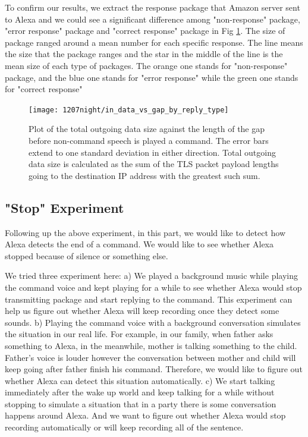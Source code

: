 To confirm our results, we extract the response package that Amazon server sent to Alexa and we could see a significant difference among "non-response" package, "error response" package and "correct response" package in Fig \ref{fig:postfix_variablegap_sizes}. The size of package ranged around a mean number for each specific response. The line means the size that the package ranges and the star in the middle of the line is the mean size of each type of packages. The orange one stands for "non-response" package, and the blue one stands for "error response" while the green one stands for "correct response" 

\begin{figure}[]
    \centering
    \texttt{[image: 1207night/in\_data\_vs\_gap\_by\_reply\_type]}
    \caption{Plot of the total outgoing data size against the length of the gap before non-command speech is played a command. The error bars extend to one standard deviation in either direction. Total outgoing data size is calculated as the sum of the TLS packet payload lengths going to the destination IP address with the greatest such sum.}
    \label{fig:postfix_variablegap_sizes}
\end{figure}








\subsection{"Stop" Experiment}

Following up the above experiment, in this part, we would like to detect how Alexa detects the end of a command. We would like to see whether Alexa stopped because of silence or something else.

We tried three experiment here: a) We played a background music while playing the command voice and kept playing for a while to see whether Alexa would stop transmitting package and start replying to the command. This experiment can help us figure out whether Alexa will keep recording once they detect some sounds. b) Playing the command voice with a background conversation simulates the situation in our real life. For example, in our family, when father asks something to Alexa, in the meanwhile, mother is talking something to the child. Father's voice is louder however the conversation between mother and child will keep going after father finish his command. Therefore, we would like to figure out whether Alexa can detect this situation automatically. c) We start talking immediately after the wake up world and keep talking for a while without stopping to simulate a situation that in a party there is some conversation happens around Alexa. And we want to figure out whether Alexa would stop recording automatically or will keep recording all of the sentence.

